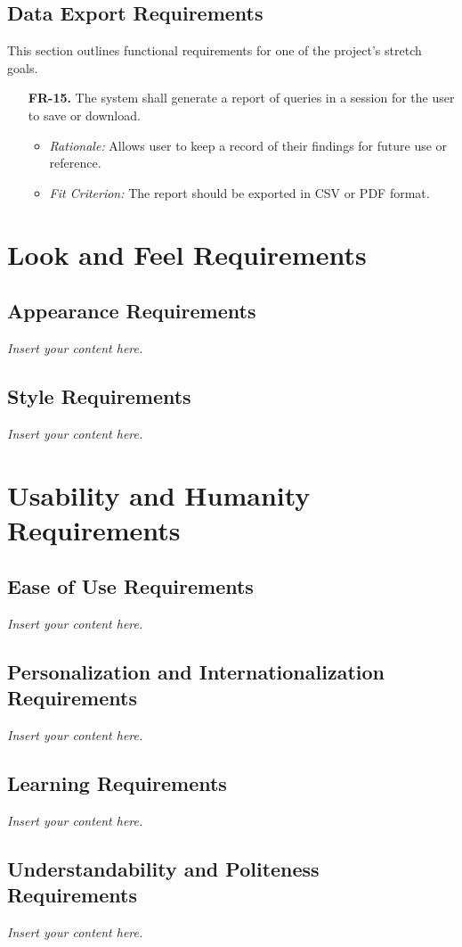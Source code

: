 \documentclass[12pt]{article}
\newcommand{\lips}{\textit{Insert your content here.}}
\begin{document}
\subsection{Data Export Requirements}
This section outlines functional requirements for one of the project's stretch goals.
\begin{enumerate}
  \item[\textbf{FR-15.}] The system shall generate a report of queries in a session for the user to save or download.
  \begin{itemize}
    \item \textit{Rationale:} Allows user to keep a record of their findings for future use or reference.
    \item \textit{Fit Criterion:} The report should be exported in CSV or PDF format.
  \end{itemize}
\end{enumerate}

\section{Look and Feel Requirements}
\subsection{Appearance Requirements}
\lips
\subsection{Style Requirements}
\lips

\section{Usability and Humanity Requirements}
\subsection{Ease of Use Requirements}
\lips
\subsection{Personalization and Internationalization Requirements}
\lips
\subsection{Learning Requirements}
\lips
\subsection{Understandability and Politeness Requirements}
\lips
\end{document}
